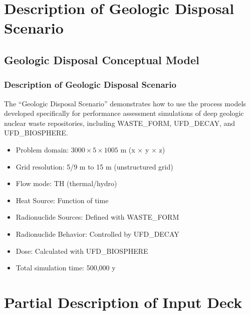 \documentclass{beamer}
\newcommand\redcomment[1]{{{\color{red} #1}}}
\begin{document}
\section{Description of Geologic Disposal Scenario}

\subsection{Geologic Disposal Conceptual Model}

\begin{frame}\frametitle{Description of Geologic Disposal Scenario}
The ``Geologic Disposal Scenario'' demonstrates how to use the process models developed specifically for performance assessment simulations of deep geologic nuclear waste repositories, including \redcomment{WASTE\_FORM}, \redcomment{UFD\_DECAY}, and \redcomment{UFD\_BIOSPHERE}.
\begin{itemize}
  \item Problem domain: $3000 \times 5 \times 1005$ m (x $\times$ y $\times$ z)
  \item Grid resolution: 5/9 m to 15 m (unstructured grid)
  \item Flow mode: \redcomment{TH} (thermal/hydro)
  \item Heat Source: Function of time
  \item Radionuclide Sources: Defined with \redcomment{WASTE\_FORM}
  \item Radionuclide Behavior: Controlled by \redcomment{UFD\_DECAY}
  \item Dose: Calculated with \redcomment{UFD\_BIOSPHERE}
  \item Total simulation time: 500,000 y
\end{itemize}

\end{frame}



\section{Partial Description of Input Deck}
\end{document}
